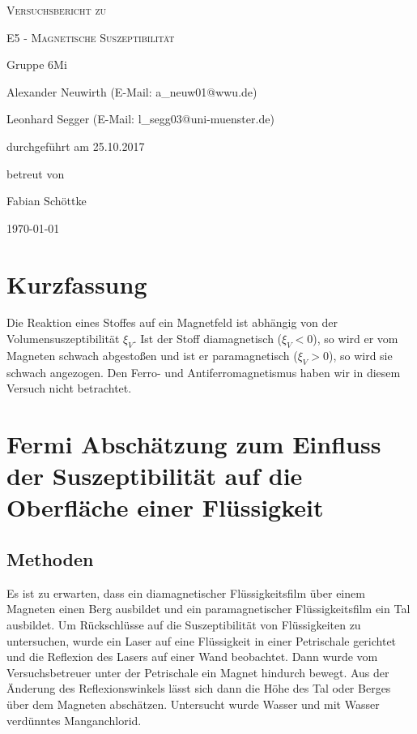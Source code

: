 \documentclass[
	a4paper,
	12pt,
	pagesize,
	ngerman
]{scrartcl}
\begin{document}
	
	\begin{titlepage}
		\centering
		{\scshape\LARGE Versuchsbericht zu \par}
		\vspace{1cm}
		{\scshape\huge E5 - Magnetische Suszeptibilität\par}
		\vspace{2.5cm}
		{\LARGE Gruppe 6Mi \par}
		\vspace{0.5cm}
		
		{\large Alexander Neuwirth (E-Mail: a\_neuw01@wwu.de) \par}
		{\large Leonhard Segger (E-Mail: l\_segg03@uni-muenster.de) \par}
		\vfill
		
		durchgeführt am 25.10.2017\par
		betreut von\par
		{\large Fabian Schöttke}
		
		\vfill
		
		{\large \today\par}
	\end{titlepage}
	\tableofcontents
	\newpage
	
	\section{Kurzfassung}
	Die Reaktion eines Stoffes auf ein Magnetfeld ist abhängig von der Volumensuszeptibilität $\xi_V$. Ist der Stoff diamagnetisch ($\xi_V<0$), so wird er vom Magneten schwach abgestoßen und ist er paramagnetisch ($\xi_V>0$), so wird sie schwach angezogen. Den Ferro- und Antiferromagnetismus haben wir in diesem Versuch nicht betrachtet.
	
	\section{Fermi Abschätzung zum Einfluss der Suszeptibilität auf die Oberfläche einer Flüssigkeit}
	\subsection{Methoden}
	Es ist zu erwarten, dass ein diamagnetischer Flüssigkeitsfilm über einem Magneten einen Berg ausbildet und ein paramagnetischer Flüssigkeitsfilm ein Tal ausbildet. 
	Um Rückschlüsse auf die Suszeptibilität von Flüssigkeiten zu untersuchen, wurde ein Laser auf eine Flüssigkeit in einer Petrischale gerichtet und die Reflexion des Lasers auf einer Wand beobachtet. Dann wurde vom Versuchsbetreuer unter der Petrischale ein Magnet hindurch bewegt. Aus der Änderung des Reflexionswinkels lässt sich dann die Höhe des Tal oder Berges über dem Magneten abschätzen. Untersucht wurde Wasser und mit Wasser verdünntes Manganchlorid.
\end{document}
